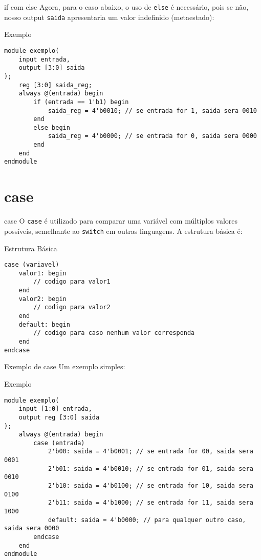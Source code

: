 \documentclass[aspectratio=169,xcolor=dvipsnames]{beamer}
\begin{document}
\begin{frame}[fragile]{if com else}
Agora, para o caso abaixo, o uso de \texttt{else} é necessário, pois se não, nosso output \texttt{saida} apresentaria um valor indefinido (metaestado):

\begin{block}{Exemplo}
\begin{verbatim}
module exemplo(
    input entrada,
    output [3:0] saida 
);
    reg [3:0] saida_reg;
    always @(entrada) begin
        if (entrada == 1'b1) begin
            saida_reg = 4'b0010; // se entrada for 1, saida sera 0010
        end
        else begin
            saida_reg = 4'b0000; // se entrada for 0, saida sera 0000
        end
    end
endmodule
\end{verbatim}
\end{block}
\end{frame}

\section{case}

\begin{frame}[fragile]{case}
O \texttt{case} é utilizado para comparar uma variável com múltiplos valores possíveis, semelhante ao \texttt{switch} em outras linguagens. A estrutura básica é:

\begin{block}{Estrutura Básica}
\begin{verbatim}
case (variavel)
    valor1: begin
        // codigo para valor1
    end
    valor2: begin
        // codigo para valor2
    end
    default: begin
        // codigo para caso nenhum valor corresponda
    end
endcase
\end{verbatim}
\end{block}
\end{frame}

\begin{frame}[fragile]{Exemplo de case}
Um exemplo simples:

\begin{block}{Exemplo}
\begin{verbatim}
module exemplo(
    input [1:0] entrada,
    output reg [3:0] saida
);
    always @(entrada) begin
        case (entrada)
            2'b00: saida = 4'b0001; // se entrada for 00, saida sera 0001
            2'b01: saida = 4'b0010; // se entrada for 01, saida sera 0010
            2'b10: saida = 4'b0100; // se entrada for 10, saida sera 0100
            2'b11: saida = 4'b1000; // se entrada for 11, saida sera 1000
            default: saida = 4'b0000; // para qualquer outro caso, saida sera 0000
        endcase
    end
endmodule
\end{verbatim}
\end{block}
\end{frame}
\end{document}
